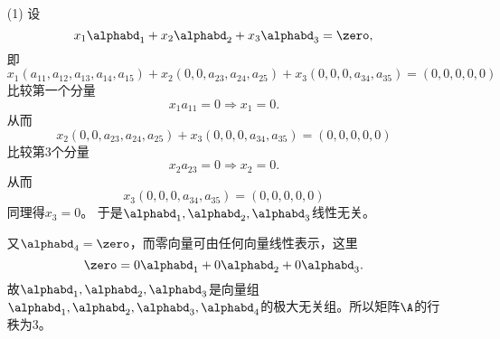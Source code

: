 \begin{itemize}
\item[(1)] 设
  $$
  x_1\alphabd_1+x_2\alphabd_2+x_3\alphabd_3=\zero,
  $$
  即
  $$
  x_1(a_{11},a_{12},a_{13},a_{14},a_{15})+
  x_2(0,0,a_{23},a_{24},a_{25})+
  x_3(0,0,0,a_{34},a_{35})=(0,0,0,0,0)
  $$  
  比较第一个分量
  $$
  x_1a_{11} = 0 \Rightarrow x_1=0.
  $$  从而
  $$
  x_2(0,0,a_{23},a_{24},a_{25})+
  x_3(0,0,0,a_{34},a_{35})=(0,0,0,0,0)
  $$  
  比较第3个分量
  $$
  x_2a_{23} = 0 \Rightarrow x_2=0.
  $$   从而
  $$
  x_3(0,0,0,a_{34},a_{35})=(0,0,0,0,0)
  $$ 
  同理得$x_3=0$。  于是$\alphabd_1,\alphabd_2,\alphabd_3$线性无关。 
  \vspace{0.1in}

  又$\alphabd_4=\zero$，而零向量可由任何向量线性表示，这里
  $$
  \zero = 0\alphabd_1+0\alphabd_2+0\alphabd_3.
  $$
  故$\alphabd_1,\alphabd_2,\alphabd_3$是向量组$\alphabd_1,\alphabd_2,\alphabd_3,\alphabd_4$的极大无关组。所以矩阵$\A$的行秩为3。
\end{itemize}






